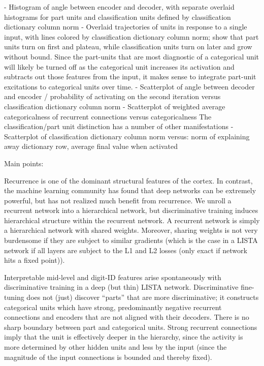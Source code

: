   - Histogram of angle between encoder and decoder, with separate overlaid histograms for part units and classification units defined by classification dictionary column norm
  - Overlaid trajectories of units in response to a single input, with lines colored by classification dictionary column norm; show that part units turn on first and plateau, while classification units turn on later and grow without bound.  Since the part-units that are most diagnostic of a categorical unit will likely be turned off as the categorical unit increases its activation and subtracts out those features from the input, it makes sense to integrate part-unit excitations to categorical units over time.
  - Scatterplot of angle between decoder and encoder / probability of activating on the second iteration versus classification dictionary column norm
  - Scatterplot of weighted average categoricalness of recurrent connections versus categoricalness
The classification/part unit distinction has a number of other manifestations
  - Scatterplot of classification dictionary column norm versus: norm of explaining away dictionary row, average final value when activated


Main points:

Recurrence is one of the dominant structural features of the cortex.  In contrast, the machine learning community has found that deep networks can be extremely powerful, but has not realized much benefit from recurrence.  We unroll a recurrent network into a hierarchical network, but discriminative training induces hierarchical structure within the recurrent network.  A recurrent network is simply a hierarchical network with shared weights.  Moreover, sharing weights is not very burdensome if they are subject to similar gradients (which is the case in a LISTA network if all layers are subject to the L1 and L2 losses (only exact if network hits a fixed point)).  

Interpretable mid-level and digit-ID features arise spontaneously with discriminative training in a deep (but thin) LISTA network.  Discriminative fine-tuning does not (just) discover ``parts'' that are more discriminative; it constructs categorical units which have strong, predominantly negative recurrent connections and encoders that are not aligned with their decoders.  There is no sharp boundary between part and categorical units.  Strong recurrent connections imply that the unit is effectively deeper in the hierarchy, since the activity is more determined by other hidden units and less by the input (since the magnitude of the input connections is bounded and thereby fixed).

